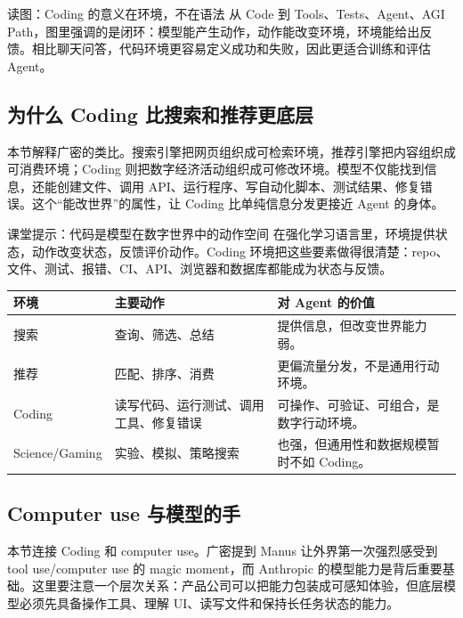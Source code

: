 \documentclass[a4paper]{article}
\begin{document}
\begin{knowledgebox}{读图：Coding 的意义在环境，不在语法}
从 Code 到 Tools、Tests、Agent、AGI Path，图里强调的是闭环：模型能产生动作，动作能改变环境，环境能给出反馈。相比聊天问答，代码环境更容易定义成功和失败，因此更适合训练和评估 Agent。
\end{knowledgebox}

\subsection{为什么 Coding 比搜索和推荐更底层}

本节解释广密的类比。搜索引擎把网页组织成可检索环境，推荐引擎把内容组织成可消费环境；Coding 则把数字经济活动组织成可修改环境。模型不仅能找到信息，还能创建文件、调用 API、运行程序、写自动化脚本、测试结果、修复错误。这个“能改世界”的属性，让 Coding 比单纯信息分发更接近 Agent 的身体。

\begin{knowledgebox}{课堂提示：代码是模型在数字世界中的动作空间}
在强化学习语言里，环境提供状态，动作改变状态，反馈评价动作。Coding 环境把这些要素做得很清楚：repo、文件、测试、报错、CI、API、浏览器和数据库都能成为状态与反馈。
\end{knowledgebox}

\noindent\begin{tabularx}{\textwidth}{p{}p{}X}
\toprule
环境 & 主要动作 & 对 Agent 的价值 \\
\midrule
搜索 & 查询、筛选、总结 & 提供信息，但改变世界能力弱。 \\
推荐 & 匹配、排序、消费 & 更偏流量分发，不是通用行动环境。 \\
Coding & 读写代码、运行测试、调用工具、修复错误 & 可操作、可验证、可组合，是数字行动环境。 \\
Science/Gaming & 实验、模拟、策略搜索 & 也强，但通用性和数据规模暂时不如 Coding。 \\
\bottomrule
\end{tabularx}

\subsection{Computer use 与模型的手}

本节连接 Coding 和 computer use。广密提到 Manus 让外界第一次强烈感受到 tool use/computer use 的 magic moment，而 Anthropic 的模型能力是背后重要基础。这里要注意一个层次关系：产品公司可以把能力包装成可感知体验，但底层模型必须先具备操作工具、理解 UI、读写文件和保持长任务状态的能力。
\end{document}
